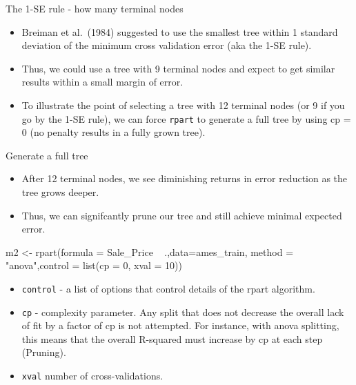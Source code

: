 \documentclass[
  10pt,
  ignorenonframetext,
]{beamer}
\newenvironment{Shaded}{}{}
\newcommand{\DataTypeTok}[1]{#1}
\newcommand{\DecValTok}[1]{#1}
\newcommand{\KeywordTok}[1]{\textcolor[rgb]{0.00,0.00,1.00}{#1}}
\newcommand{\NormalTok}[1]{#1}
\newcommand{\OperatorTok}[1]{#1}
\newcommand{\StringTok}[1]{\textcolor[rgb]{0.00,0.50,0.50}{#1}}
\providecommand{\tightlist}{%
  \setlength{\itemsep}{0pt}\setlength{\parskip}{0pt}}
\begin{document}
\begin{frame}[fragile]{The 1-SE rule - how many terminal nodes}
\protect\hypertarget{the-1-se-rule---how-many-terminal-nodes}{}

\begin{itemize}
\tightlist
\item
  Breiman et al.~(1984) suggested to use the smallest tree within 1
  standard deviation of the minimum cross validation error (aka the 1-SE
  rule).
\item
  Thus, we could use a tree with 9 terminal nodes and expect to get
  similar results within a small margin of error.
\item
  To illustrate the point of selecting a tree with 12 terminal nodes (or
  9 if you go by the 1-SE rule), we can force \texttt{rpart} to generate
  a full tree by using cp = 0 (no penalty results in a fully grown
  tree).
\end{itemize}

\end{frame}

\begin{frame}[fragile]{Generate a full tree}
\protect\hypertarget{generate-a-full-tree}{}

\begin{itemize}
\tightlist
\item
  After 12 terminal nodes, we see diminishing returns in error reduction
  as the tree grows deeper.
\item
  Thus, we can signifcantly prune our tree and still achieve minimal
  expected error.
\end{itemize}

\begin{Shaded}
\begin{Highlighting}[]
\NormalTok{m2 <-}\StringTok{ }\KeywordTok{rpart}\NormalTok{(}\DataTypeTok{formula =}\NormalTok{ Sale_Price }\OperatorTok{~}\StringTok{ }\NormalTok{.,}\DataTypeTok{data=}\NormalTok{ames_train,}
    \DataTypeTok{method  =} \StringTok{"anova"}\NormalTok{,}\DataTypeTok{control =} \KeywordTok{list}\NormalTok{(}\DataTypeTok{cp =} \DecValTok{0}\NormalTok{, }\DataTypeTok{xval =} \DecValTok{10}\NormalTok{))}
\end{Highlighting}
\end{Shaded}

\begin{itemize}
\tightlist
\item
  \texttt{control} - a list of options that control details of the rpart
  algorithm.
\item
  \texttt{cp} - complexity parameter. Any split that does not decrease
  the overall lack of fit by a factor of cp is not attempted. For
  instance, with anova splitting, this means that the overall R-squared
  must increase by cp at each step (Pruning).
\item
  \texttt{xval} number of cross-validations. 
\end{itemize}

\end{frame}
\end{document}

